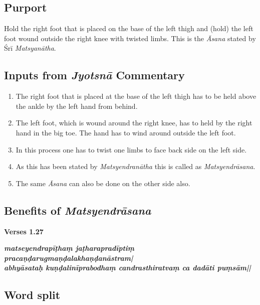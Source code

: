 \subsection*{Purport}
\vspace{-10pt}

Hold the right foot that is placed on the base of the left thigh and (hold) the left foot wound outside the right knee with twisted limbs. This is the \textit{Āsana} stated by Śrī \textit{Matsyanātha}.
\vspace{-10pt}

\subsection*{Inputs from \textit{Jyotsnā} Commentary}
\vspace{-10pt}

\begin{enumerate}
\itemsep=0pt
\item The right foot that is placed at the base of the left thigh has to be held above the ankle by the left hand from behind. 
\item The left foot, which is wound around the right knee, has to held by the right hand in the big toe. The hand has to wind around outside the left foot. 
\item In this process one has to twist one limbs to face back side on the left side.
\item As this has been stated by \textit{Matsyendranātha} this is called as \textit{Matsyendrāsana}. 
\item The same \textit{Āsana} can also be done on the other side also.  
\end{enumerate}

\subsection*{Benefits of \textit{Matsyendrāsana}}

\noindent 
\textbf{Verses 1.27}

\begin{shloka}
\textit{\textbf{matseyendrapīṭhaṃ jaṭharapradīptiṃ pracaṇḍarugmaṇḍalakhaṇḍanāstram|}\\
\textbf{abhyāsataḥ kuṇḍalinīprabodhaṃ candrasthiratvaṃ ca dadāti puṃsām||}}
\end{shloka}

\subsection*{Word split}

